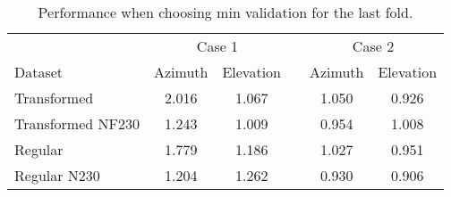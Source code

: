 

\begin{table}[!htbp]
    \centering
    \caption{Performance when choosing min validation for the last fold.}
    \begin{tabular}{lcc c cc}
        \toprule
        \multicolumn{1}{c}{} & \multicolumn{2}{c}{Case 1} & & \multicolumn{2}{c}{Case 2} \\
        \cmidrule(lr){2-3} \cmidrule(lr){5-6}
        Dataset &  Azimuth  &  Elevation  & & Azimuth  &  Elevation  \\
        \midrule
        Transformed       & 2.016 & 1.067 & & 1.050 & 0.926  \\
        Transformed NF230 & 1.243 & 1.009 & & 0.954 & 1.008  \\
        Regular           & 1.779 & 1.186 & & 1.027 & 0.951  \\
        Regular N230      & 1.204 & 1.262 & & 0.930 & 0.906  \\
        \bottomrule
    \end{tabular}
    \label{tab:minval_fold5_whole}
\end{table}

